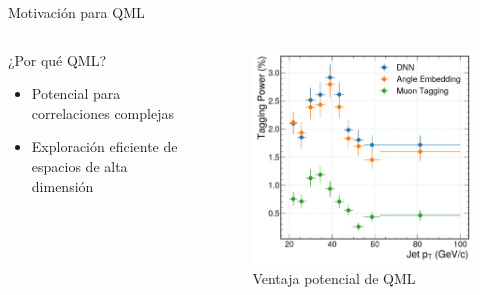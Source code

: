 \documentclass[aspectratio=169]{beamer}
\begin{document}
\begin{frame}{Motivación para QML}
  \begin{columns}
    \begin{column}{0.6\textwidth}
      \begin{alertblock}{¿Por qué QML?}
        \begin{itemize}
          \item Potencial para correlaciones complejas
          \item Exploración eficiente de espacios de alta dimensión
        \end{itemize}
      \end{alertblock}
    \end{column}
    \begin{column}{0.4\textwidth}
      \begin{figure}
        \includegraphics[width=\textwidth]{motiv.png}
        \caption{Ventaja potencial de QML}
      \end{figure}
    \end{column}
  \end{columns}
\end{frame}
\end{document}
